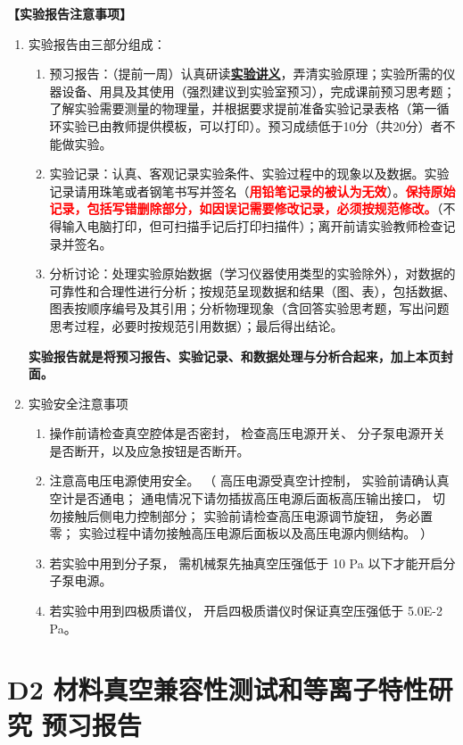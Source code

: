 \documentclass[dvipsnames, svgnames,a4paper,11pt]{article}
\begin{document}
\textbf{【实验报告注意事项】}
\begin{enumerate}
	\item 实验报告由三部分组成：
	\begin{enumerate}
		\item 预习报告：（提前一周）认真研读\underline{\textbf{实验讲义}}，弄清实验原理；实验所需的仪器设备、用具及其使用（强烈建议到实验室预习），完成课前预习思考题；了解实验需要测量的物理量，并根据要求提前准备实验记录表格（第一循环实验已由教师提供模板，可以打印）。预习成绩低于10分（共20分）者不能做实验。
	    \item 实验记录：认真、客观记录实验条件、实验过程中的现象以及数据。实验记录请用珠笔或者钢笔书写并签名（\textcolor{red}{\textbf{用铅笔记录的被认为无效}}）。\textcolor{red}{\textbf{保持原始记录，包括写错删除部分，如因误记需要修改记录，必须按规范修改。}}（不得输入电脑打印，但可扫描手记后打印扫描件）；离开前请实验教师检查记录并签名。
	    \item 分析讨论：处理实验原始数据（学习仪器使用类型的实验除外），对数据的可靠性和合理性进行分析；按规范呈现数据和结果（图、表），包括数据、图表按顺序编号及其引用；分析物理现象（含回答实验思考题，写出问题思考过程，必要时按规范引用数据）；最后得出结论。
	\end{enumerate}
	\textbf{实验报告就是将预习报告、实验记录、和数据处理与分析合起来，加上本页封面。}
	\item 实验安全注意事项
		\begin{enumerate}[label=\roman*.]
			\item 操作前请检查真空腔体是否密封， 检查高压电源开关、 分子泵电源开关是否断开，以及应急按钮是否断开。
			\item 注意高电压电源使用安全。 （ 高压电源受真空计控制， 实验前请确认真空计是否通电； 通电情况下请勿插拔高压电源后面板高压输出接口， 切勿接触后侧电力控制部分； 实验前请检查高压电源调节旋钮， 务必置零； 实验过程中请勿接触高压电源后面板以及高压电源内侧结构。 ）
			\item 若实验中用到分子泵， 需机械泵先抽真空压强低于 10 Pa 以下才能开启分子泵电源。
			\item 若实验中用到四极质谱仪， 开启四极质谱仪时保证真空压强低于 5.0E-2 Pa。
		\end{enumerate}
\end{enumerate}


\clearpage
\tableofcontents
\clearpage

\setcounter{section}{0}
\section{D2 \quad 材料真空兼容性测试和等离子特性研究 \quad\heiti 预习报告}
	
\end{document}
